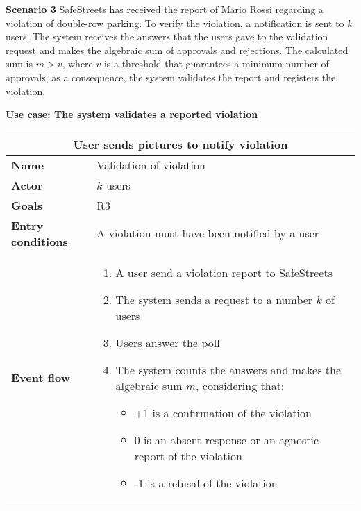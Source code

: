 \begin{description}
    \item \textbf{Scenario 3} \newline
        SafeStreets has received the report of Mario Rossi regarding a violation of double-row parking. To verify the violation, a notification is sent to $k$ users. The system receives the answers that the users gave to the validation request and makes the algebraic sum of approvals and rejections. The calculated sum is $m > v$, where $v$ is a threshold that guarantees a minimum number of approvals; as a consequence, the system validates the report and registers the violation.

    \item \textbf{Use case: The system validates a reported violation}
        \begin{center}
            \begin{tabular}{|p{3cm}|p{7cm}|}
                \multicolumn{2}{c}{\textbf{User sends pictures to notify violation}} \\
                \hline
                \textbf{Name} & Validation of violation  \\
                \hline
                \textbf{Actor} & $k$ users \\
                \hline
                \textbf{Goals} & R3 \\
                \hline
                \textbf{Entry conditions} & A violation must have been notified by a user \\
                \hline
                \textbf{Event flow} &
                \begin{enumerate}
                    \item A user send a violation report to SafeStreets
                    \item The system sends a request to a number $k$ of users
                    \item Users answer the poll
                    \item The system counts the answers and makes the algebraic sum $m$, considering that:
                    \begin{itemize}
                        \item +1 is a confirmation of the violation
                        \item 0 is an absent response or an agnostic report of the violation
                        \item -1 is a refusal of the violation 

\end{itemize}
\end{enumerate}
\end{tabular}
\end{center}
\end{description}
